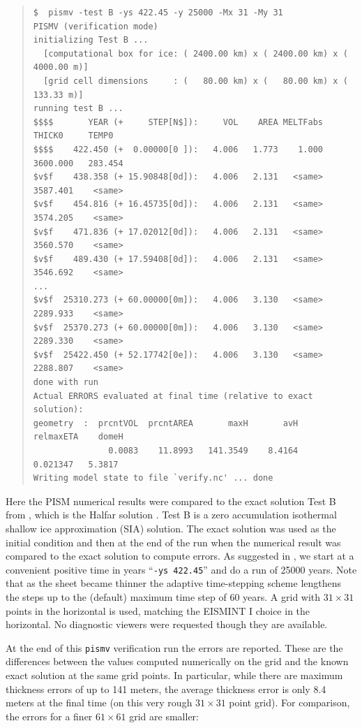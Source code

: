 \documentclass[11pt,final]{amsart}
\renewcommand{\t}[1]{\texttt{#1}}
\begin{document}
\small\begin{quote}\begin{verbatim}
$  pismv -test B -ys 422.45 -y 25000 -Mx 31 -My 31
PISMV (verification mode)
initializing Test B ...
  [computational box for ice: ( 2400.00 km) x ( 2400.00 km) x ( 4000.00 m)]
  [grid cell dimensions     : (   80.00 km) x (   80.00 km) x (  133.33 m)]
running test B ...
$$$$       YEAR (+     STEP[N$]):     VOL    AREA MELTFabs     THICK0     TEMP0
$$$$    422.450 (+  0.00000[0 ]):   4.006   1.773    1.000   3600.000   283.454
$v$f    438.358 (+ 15.90848[0d]):   4.006   2.131   <same>   3587.401    <same>
$v$f    454.816 (+ 16.45735[0d]):   4.006   2.131   <same>   3574.205    <same>
$v$f    471.836 (+ 17.02012[0d]):   4.006   2.131   <same>   3560.570    <same>
$v$f    489.430 (+ 17.59408[0d]):   4.006   2.131   <same>   3546.692    <same>
...
$v$f  25310.273 (+ 60.00000[0m]):   4.006   3.130   <same>   2289.933    <same>
$v$f  25370.273 (+ 60.00000[0m]):   4.006   3.130   <same>   2289.330    <same>
$v$f  25422.450 (+ 52.17742[0e]):   4.006   3.130   <same>   2288.807    <same>
done with run
Actual ERRORS evaluated at final time (relative to exact solution):
geometry  :  prcntVOL  prcntAREA       maxH       avH   relmaxETA    domeH
               0.0083    11.8993   141.3549    8.4164    0.021347   5.3817
Writing model state to file `verify.nc' ... done
\end{verbatim}
\end{quote}\normalsize

Here the PISM numerical results were compared to the exact solution Test B from \cite{BLKCB}, which is the Halfar solution \cite{Halfar83}.  Test B is a zero accumulation isothermal shallow ice approximation (SIA) solution.  The exact solution was used as the initial condition and then at the end of the run when the numerical result was compared to the exact solution to compute errors.  As suggested in \cite{BLKCB}, we start at a convenient positive time in years ``\verb|-ys 422.45|''  and do a run of 25000 years.  Note that as the sheet became thinner the adaptive time-stepping scheme lengthens the steps up to the (default) maximum time step of 60 years.  A grid with $31\times 31$ points in the horizontal is used, matching the EISMINT I choice \cite{EISMINT96} in the horizontal.  No diagnostic viewers were requested though they are available.

At the end of this \t{pismv} verification run the errors are reported.  These are the differences between the values computed numerically on the grid and the known exact solution at the same grid points.  In particular, while there are maximum thickness errors of up to 141 meters, the average thickness error is only 8.4 meters at the final time (on this very rough $31\times 31$ point grid).  For comparison, the errors for a finer $61\times 61$ grid are smaller:
\end{document}
